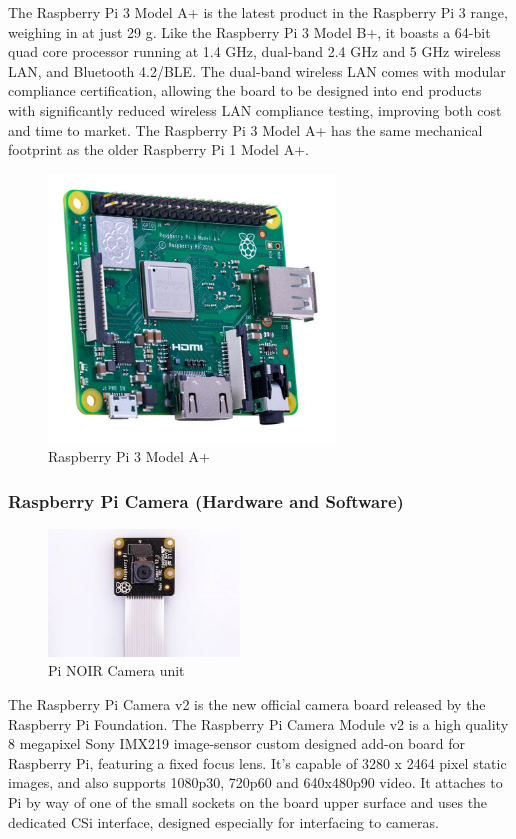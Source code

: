 \par The Raspberry Pi 3 Model A+ is the latest product in the Raspberry Pi 3 range, weighing in at just 29 g. Like the Raspberry Pi 3 Model B+, it boasts a 64-bit quad core processor running at 1.4 GHz, dual-band 2.4 GHz and 5 GHz wireless LAN, and Bluetooth 4.2/BLE. The dual-band wireless LAN comes with modular compliance certification, allowing the board to be designed into end products with significantly reduced wireless LAN compliance testing, improving both cost and time to market. The Raspberry Pi 3 Model A+ has the same mechanical footprint as the older Raspberry Pi 1 Model A+.
	\begin{figure}[h]
		\centering
		\includegraphics[width=3in]{rasPi.png}
		\caption{Raspberry Pi 3 Model A+}
	\end{figure}
\subsubsection{Raspberry Pi Camera (Hardware and Software)}
\begin{figure}[h]
	\centering
	\includegraphics[width=2in]{picam.jpg}
	\caption{Pi NOIR Camera unit}
\end{figure}
\par The Raspberry Pi Camera v2 is the new official camera board released by the Raspberry Pi Foundation. The Raspberry Pi Camera Module v2 is a high quality 8 megapixel Sony IMX219 image-sensor custom designed add-on board for Raspberry Pi, featuring a fixed focus lens. It's capable of 3280 x 2464 pixel static images, and also supports 1080p30, 720p60 and 640x480p90 video. It attaches to Pi by way of one of the small sockets on the board upper surface and uses the dedicated CSi interface, designed especially for interfacing to cameras.

